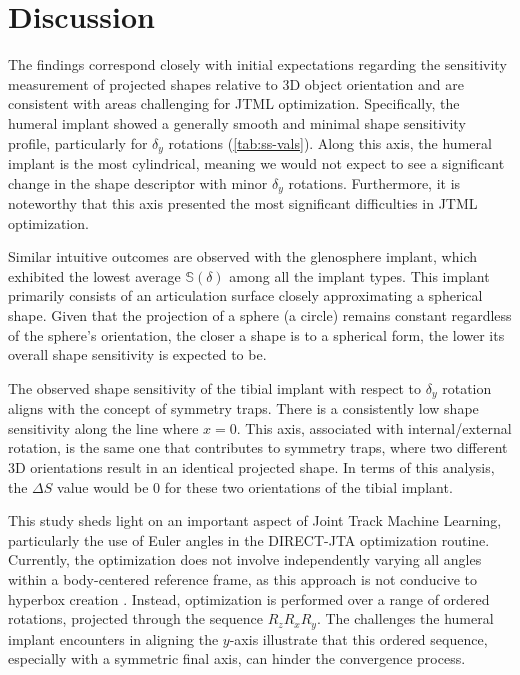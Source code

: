 \section{Discussion}
The findings correspond closely with initial expectations regarding the sensitivity measurement of projected shapes relative to 3D object orientation and are consistent with areas challenging for JTML optimization.
Specifically, the humeral implant showed a generally smooth and minimal shape sensitivity profile, particularly for $\delta_{y}$ rotations (\cref{tab:ss-vals}).
Along this axis, the humeral implant is the most cylindrical, meaning we would not expect to see a significant change in the shape descriptor with minor $\delta_{y}$ rotations.
Furthermore, it is noteworthy that this axis presented the most significant difficulties in JTML optimization.

Similar intuitive outcomes are observed with the glenosphere implant, which exhibited the lowest average $\mathbb{S}(\delta)$ among all the implant types.
This implant primarily consists of an articulation surface closely approximating a spherical shape.
Given that the projection of a sphere (a circle) remains constant regardless of the sphere's orientation, the closer a shape is to a spherical form, the lower its overall shape sensitivity is expected to be.

The observed shape sensitivity of the tibial implant with respect to $\delta_{y}$ rotation aligns with the concept of symmetry traps.
There is a consistently low shape sensitivity along the line where $x=0$.
This axis, associated with internal/external rotation, is the same one that contributes to symmetry traps, where two different 3D orientations result in an identical projected shape.
In terms of this analysis, the $\Delta S$ value would be $0$ for these two orientations of the tibial implant.

This study sheds light on an important aspect of Joint Track Machine Learning, particularly the use of Euler angles in the DIRECT-JTA optimization routine.
Currently, the optimization does not involve independently varying all angles within a body-centered reference frame, as this approach is not conducive to hyperbox creation \cite{floodAutomatedRegistration3D2018,jonesLipschitzianOptimizationLipschitz1993}.
Instead, optimization is performed over a range of ordered rotations, projected through the sequence $R_{z}R_{x}R_{y}$.
The challenges the humeral implant encounters in aligning the $y$-axis illustrate that this ordered sequence, especially with a symmetric final axis, can hinder the convergence process.

